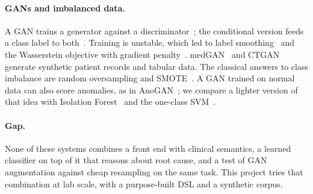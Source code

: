 \paragraph{GANs and imbalanced data.} A GAN trains a generator against a discriminator~\cite{goodfellow2014}; the
conditional version feeds a class label to both~\cite{mirza2014}. Training is unstable, which led to label
smoothing~\cite{salimans2016} and the Wasserstein objective with gradient penalty~\cite{arjovsky2017,gulrajani2017}.
medGAN~\cite{choi2017} and CTGAN~\cite{xu2019} generate synthetic patient records and tabular data. The classical
answers to class imbalance are random oversampling and SMOTE~\cite{chawla2002}. A GAN trained on normal data can also
score anomalies, as in AnoGAN~\cite{schlegl2017}; we compare a lighter version of that idea with Isolation
Forest~\cite{liu2008} and the one-class SVM~\cite{scholkopf2001}.

\paragraph{Gap.} None of these systems combines a front end with clinical semantics, a learned classifier on top of it
that reasons about root cause, and a test of GAN augmentation against cheap resampling on the same task. This project
tries that combination at lab scale, with a purpose-built DSL and a synthetic corpus.
